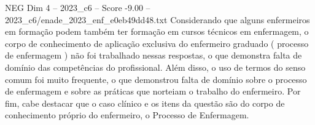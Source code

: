 \begin{textsample}{NEG Dim 4 – 2023\_c6 – Score -9.00 – 2023\_c6/enade\_2023\_enf\_e0eb49dd48.txt}
Considerando que alguns enfermeiros em formação podem também ter formação em cursos técnicos em enfermagem, o corpo de conhecimento de aplicação exclusiva do enfermeiro graduado ( processo de enfermagem ) não foi trabalhado nessas respostas, o que demonstra falta de domínio das competências do profissional.
Além disso, o uso de termos do senso comum foi muito frequente, o que demonstrou falta de domínio sobre o processo de enfermagem e sobre as práticas que norteiam o trabalho do enfermeiro.
Por fim, cabe destacar que o caso clínico e os itens da questão são do corpo de conhecimento próprio do enfermeiro, o Processo de Enfermagem.

\end{textsample}
